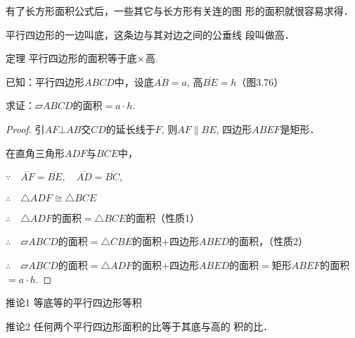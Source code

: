     有了长方形面积公式后，一些其它与长方形有关连的图
    形的面积就很容易求得．

    平行四边形的一边叫底，这条边与其对边之间的公垂线
    段叫做高．

\begin{blk}
    {定理}
平行四边形的面积等于底$\times$高.
\end{blk}

已知：平行四边形$ABCD$中，设底$\overline{AB}=a$, 高$\overline{BE}=h$（图3.76）

求证：$\parallelogram ABCD$的面积$=a\cdot h$.

\begin{figure}[htp]
    \centering
    \caption{}
\end{figure}

\begin{proof}
    引$AF\bot AB$交$CD$的延长线于$F$, 
    则$AF\parallel BE$, 四边形$ABEF$是矩形．

    在直角三角形$ADF$与$BCE$中，

$\because\quad \overline{AF}=\overline{BE},\quad \overline{AD}=\overline{BC}$,

$\therefore\quad     \triangle ADF\cong \triangle BCE$

$\therefore\quad \triangle ADF$的面积$=\triangle BCE$的面积（性质1）

$\therefore\quad \parallelogram ABCD$的面积$=\triangle CBE$的面积$+$四边形$ABED$的面积，（性质2）

$\therefore\quad \parallelogram ABCD$的面积$=\triangle ADF$的面积$+$四边形$ABED$的面积$=$矩形$ABEF$的面积$=a\cdot h$.
\end{proof}


\begin{blk}
    {推论1} 等底等的平行四边形等积
\end{blk}

\begin{blk}
    {推论2} 任何两个平行四边形面积的比等于其底与高的
积的比．
\end{blk}

